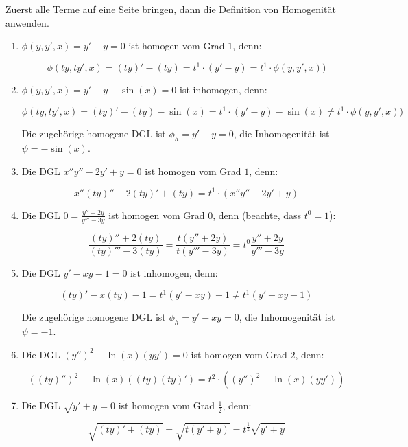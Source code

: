 \item Zuerst alle Terme auf eine Seite bringen, dann die Definition von Homogenität anwenden.

\begin{enumerate}

\item $\phi(y,y',x) = y'-y = 0$ ist homogen vom Grad $1$, denn:

$$\phi(ty,ty',x) = (ty)'-(ty) = t^1\cdot(y'-y) = t^1\cdot\phi(y,y',x))$$

\item $\phi(y,y',x) = y'-y-\sin(x) = 0$ ist inhomogen, denn:

$$\phi(ty,ty',x) = (ty)'-(ty)-\sin(x) = t^1 \cdot(y'-y) -\sin(x) \ne t^1\cdot\phi(y,y',x))$$

Die zugehörige homogene DGL ist $\phi_h = y'-y = 0$, die Inhomogenität ist $\psi=-\sin(x)$.

\item Die DGL $x''y''-2y'+y=0$ ist homogen vom Grad $1$, denn:

$$x''(ty)''-2(ty)'+(ty) = t^1\cdot(x''y''-2y'+y)$$

\item Die DGL $0=\frac{y''+2y}{y'''-3y}$ ist homogen vom Grad $0$, denn (beachte, dass $t^0=1$):

$$\frac{(ty)''+2(ty)}{(ty)'''-3(ty)} = \frac{t(y''+2y)}{t(y'''-3y)} = t^0 \frac{y''+2y}{y'''-3y}$$

\item Die DGL $y'-xy-1=0$ ist inhomogen, denn:

$$(ty)'-x(ty)-1=t^1 (y'-xy)-1 \ne t^1 (y'-xy-1)$$

Die zugehörige homogene DGL ist $\phi_h = y'-xy=0$, die Inhomogenität ist $\psi = -1$.

\item Die DGL $(y'')^2-\ln(x)(yy') = 0$ ist homogen vom Grad $2$, denn:

$$((ty)'')^2-\ln(x)((ty)(ty)') = t^2\cdot((y'')^2-\ln(x)(yy'))$$

\item Die DGL $\sqrt{y'+y}=0$ ist homogen vom Grad $\frac{1}{2}$, denn:

$$\sqrt{(ty)'+(ty)} = \sqrt{t(y'+y)} = t^{\frac{1}{2}}\sqrt{y'+y}$$

\end{enumerate}

